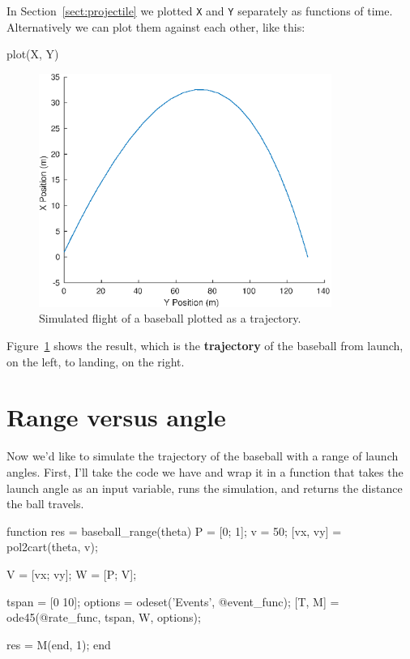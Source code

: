\documentclass[
]{book}
\numberwithin{Answer}{chapter}
\numberwithin{Exercise}{chapter}
\begin{document}
In Section~\ref{sect:projectile} we plotted {\tt X} and {\tt Y} separately as functions of time.  Alternatively we can plot them against each other, like this:

\begin{code}
    plot(X, Y)
\end{code}

\begin{figure}
\centerline{\includegraphics[height=3in]{book/figs/baseball3.eps}}
\caption{Simulated flight of a baseball plotted as a trajectory.}
\label{fig:baseball3}
\end{figure}

Figure~\ref{fig:baseball3} shows the result, which is the {\bf trajectory} of the baseball from launch, on the left, to landing, on the right.



\section{Range versus angle}

Now we'd like to simulate the trajectory of the baseball with a range of launch angles.  First, I'll take the code we have and wrap it in a function that takes the launch angle as an input variable, runs the simulation, and returns the distance the ball travels.


\begin{code}
function res = baseball_range(theta)
    P = [0; 1];       
    v = 50;           
    [vx, vy] = pol2cart(theta, v);
    
    V = [vx; vy];     %
    W = [P; V];       %
    
    tspan = [0 10];
    options = odeset('Events', @event_func);
    [T, M] = ode45(@rate_func, tspan, W, options);
    
    res = M(end, 1);
end
\end{code}
\end{document}
